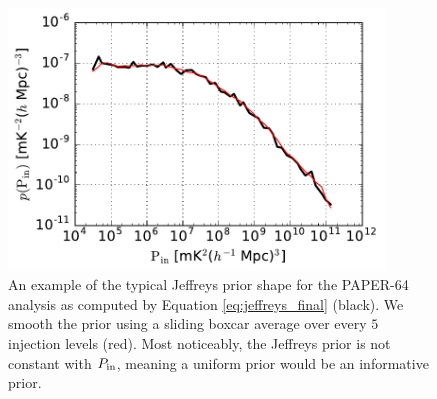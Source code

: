 \documentclass[preprint2,numberedappendix,tighten]{aastex6}  %
\begin{document}
\begin{figure}
	\centering
	\includegraphics[width=10cm]{plots/jeffrey_prior.pdf}
	\caption{An example of the typical Jeffreys prior shape for the PAPER-64 analysis as computed by Equation \eqref{eq:jeffreys_final} (black). We smooth the prior using a sliding boxcar average over every $5$ injection levels (red). Most noticeably, the Jeffreys prior is not constant with $P_{\rm in}$, meaning a uniform prior would be an informative prior.}
	\label{fig:jeffreys2}
\end{figure}
\end{document}
